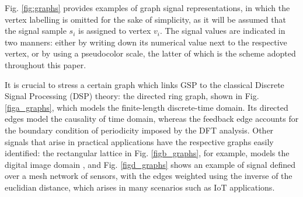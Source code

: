 Fig. \ref{fig:graphs} provides examples of graph signal representations, in which the vertex labelling is omitted for the sake of simplicity, as it will be assumed that the signal sample $ s_i $ is assigned to vertex $ v_i $. The signal values are indicated in two manners: either by writing down its numerical value next to the respective vertex, or by using a pseudocolor scale, the latter of which is the scheme adopted throughout this paper.


It is crucial to stress a certain graph which links GSP to the classical Discrete Signal Processing (DSP) theory: the directed ring graph, shown in Fig. \ref{figa_graphs}, which models the finite-length discrete-time domain. Its directed edges model the causality of time domain, whereas the feedback edge accounts for the boundary condition of periodicity imposed by the DFT analysis. Other signals that arise in practical applications have the respective graphs easily identified: the rectangular lattice in Fig. \ref{figb_graphs}, for example, models the digital image domain \cite{sandryhaila2012nearest}, and Fig. \ref{figd_graphs} shows an example of signal defined over a mesh network of sensors, with the edges weighted using the inverse of the euclidian distance, which arises in many scenarios such as IoT applications.

